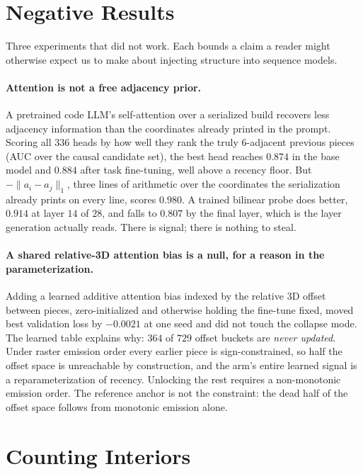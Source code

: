 \section{Negative Results}
\label{app:negative}

Three experiments that did not work. Each bounds a claim a reader might
otherwise expect us to make about injecting structure into sequence models.

\paragraph{Attention is not a free adjacency prior.} A pretrained code LLM's
self-attention over a serialized build recovers less adjacency information than
the coordinates already printed in the prompt. Scoring all $336$ heads by how
well they rank the truly $6$-adjacent previous pieces (AUC over the causal
candidate set), the best head reaches $0.874$ in the base model and $0.884$
after task fine-tuning, well above a recency floor. But $-\|a_i - a_j\|_1$,
three lines of arithmetic over the coordinates the serialization already prints
on every line, scores $0.980$. A trained bilinear probe does better, $0.914$ at
layer $14$ of $28$, and falls to $0.807$ by the final layer, which is the layer
generation actually reads. There is signal; there is nothing to steal.

\paragraph{A shared relative-{3D} attention bias is a null, for a reason in the
parameterization.} Adding a learned additive attention bias indexed by the
relative {3D} offset between pieces, zero-initialized and otherwise holding the
fine-tune fixed, moved best validation loss by $-0.0021$ at one seed and did not
touch the collapse mode. The learned table explains why: $364$ of $729$ offset
buckets are \emph{never updated}. Under raster emission order every earlier
piece is sign-constrained, so half the offset space is unreachable by
construction, and the arm's entire learned signal is a reparameterization of
recency. Unlocking the rest requires a non-monotonic emission order. The
reference anchor is not the constraint: the dead half of the offset space
follows from monotonic emission alone.

\section{Counting Interiors}
\label{app:interior}

